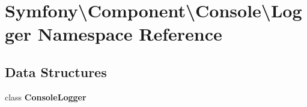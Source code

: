 \section{Symfony\textbackslash{}Component\textbackslash{}Console\textbackslash{}Logger Namespace Reference}
\label{namespace_symfony_1_1_component_1_1_console_1_1_logger}
\subsection*{Data Structures}
\begin{DoxyCompactItemize}
\item 
class {\bf Console\+Logger}
\end{DoxyCompactItemize}
